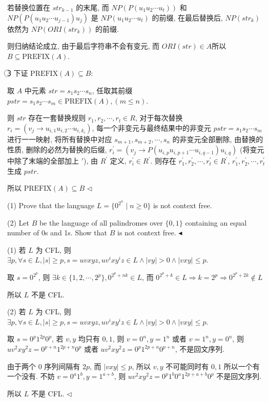 \documentclass[11pt]{article}
\newenvironment{problem}[2][Problem]{\begin{trivlist}
		\item[\hskip \labelsep {\bfseries #1}\hskip \labelsep {\bfseries #2.}]}{\hfill$\blacktriangleleft$\end{trivlist}}
\newenvironment{answer}[1][Answer]{\begin{trivlist}
		\item[\hskip \labelsep {\bfseries #1.}\hskip \labelsep]}{\hfill$\lhd$\end{trivlist}}
\begin{document}
\begin{answer}
		若替换位置在 $str_{k-1}$ 的末尾, 而 $NP(P(u_1u_2\cdots u_t))$ 和 $NP(P(u_1u_2\cdots u_{j-1})u_j)$ 是 $NP(u_1u_2\cdots u_t)$ 的前缀, 在最后替换后, $NP(str_k)$ 依然为 $NP(ORI(str_k))$ 的前缀.
		
		则归纳结论成立, 由于最后字符串不会有变元, 而 $ORI(str)\in A$所以 $B\subseteq \text{PREFIX}(A)$.
		
		\textcircled{3} 下证 $\text{PREFIX}(A)\subseteq B$:
		
		取 $A$ 中元素 $str=s_1s_2\cdots s_n$, 任取其前缀 $pstr=s_1s_2\cdots s_m\in\text{PREFIX}(A),(m\leq n)$.
		
		则 $str$ 存在一套替换规则 $r_1,r_2,\cdots,r_t\in R$, 对于每次替换 $r_i=(v_j\rightarrow u_{i,1}u_{i,2}\cdots u_{i,k_i})$, 每一个非变元与最终结果中的非变元 $pstr=s_1s_2\cdots s_m$ 进行一一映射, 将所有替换中对应 $s_{m+1},s_{m+2},\cdots,s_n$ 的非变元全部删除, 由替换的性质, 删除的必然为替换的后缀, $r_i^\prime=(v_j\rightarrow P(u_{i,p}u_{i,p+1}\cdots u_{i,q-1})u_{i,q})$ (将变元中除了末端的全部加上 $\prime$), 由 $R^\prime$ 定义, $r_i^\prime\in R^\prime$. 则存在 $r_1^\prime,r_2^\prime,\cdots,r_t^\prime\in R^\prime$, $r_1^\prime,r_2^\prime,\cdots,r_t^\prime$ 生成 $pstr$.
		
		所以 $\text{PREFIX}(A)\subseteq B$
	\end{answer}
	\begin{problem}{3.(12 points)}
		(1) Prove that the language $L = \{0^{2^n} \mid n \ge 0\}$ is not context free.
		
		(2) Let $B$ be the language of all palindromes over $\{0, 1\}$ containing an equal number of 0s and 1s. Show that $B$ is not context free.
	\end{problem}
	\begin{answer}
		(1) 若 $L$ 为 CFL, 则 $\exists p,\forall s\in L,|s|\geq p,s=uvxyz,uv^ixy^iz\in L\wedge |vy|>0\wedge|vxy|\leq p$.
		
		取 $s=0^{2^p}$, 则 $\exists k\in\{1,2,\cdots,2^p\}, 0^{2^p+nk}\in L$, 而 $0^{2^p+k}\in L\Rightarrow k=2^p\Rightarrow0^{2^p+2k}\notin L$
		
		所以 $L$ 不是 CFL.
		
		(2) 若 $L$ 为 CFL, 则 $\exists p,\forall s\in L,|s|\geq p,s=uvxyz,uv^ixy^iz\in L\wedge |vy|>0\wedge|vxy|\leq p$.
		
		取 $s=0^p1^{2p}0^p$, 若 $v,y$ 均只有 $0,1$, 则 $v=0^n,y=1^n$ 或者 $v=1^n,y=0^n$, 则 $uv^2xy^2z=0^{p+n}1^{2p+n}0^p$ 或者 $uv^2xy^2z=0^p1^{2p+n}0^{p+n}$, 不是回文序列.
		
		由于两个 $0$ 序列间隔有 $2p$, 而 $|vxy|\leq p$, 所以 $v,y$ 不可能同时有 $0,1$ 所以一个有一个没有. 不妨 $v=0^a1^b,y=1^{a+b}$, 则 $uv^2xy^2z=0^p1^b0^a1^{2p+a+b}0^p$ 不是回文序列.
		
		所以 $L$ 不是 CFL.
	\end{answer}
\end{document}

